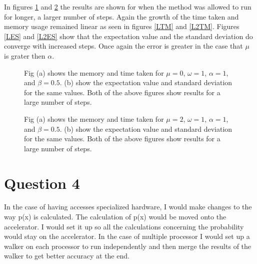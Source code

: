 \documentclass{article}
\begin{document}
In figures \ref{long} and \ref{long2} the results are shown for when the method was allowed to run for longer, a larger number of steps. Again the growth of the time taken and memory usage remained linear as seen in figures \ref{LTM} and \ref{L2TM}.  Figures \ref{LES} and \ref{L2ES} show that the expectation value and the standard deviation do converge with increased steps. Once again the error is greater in the case that $\mu$ is grater then $\alpha$.

\begin{figure}[!ht]
\centering
{}  

\caption{Fig (a) shows the memory and time taken for $\mu=0$, $\omega=1$, $\alpha=1$, and $\beta=0.5$. (b) show the expectation value and standard deviation for the same values. Both of the above figures show results for a large number of steps.}
\label{long}
\end{figure}

\begin{figure}[!ht]
\centering
{}  

\caption{Fig (a) shows the memory and time taken for $\mu=2$, $\omega=1$, $\alpha=1$, and $\beta=0.5$. (b) show the expectation value and standard deviation for the same values. Both of the above figures show results for a large number of steps.}
\label{long2}
\end{figure}


\section{Question 4}

In the case of having accesses specialized hardware,  I would make changes to the way p(x) is calculated. The calculation of p(x) would be moved onto the accelerator. I would set it up so all the calculations concerning the probability would stay on the accelerator.  In the case of multiple processor I would set up a walker on each processor to run independently and then merge the results of the walker to get better accuracy at the end.



{}%
\end{document}
